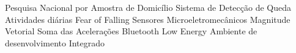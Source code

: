 \begin{acronym}[ACRONYM] 

 { Pesquisa Nacional por Amostra de Domicílio }
 {Sistema de Detecção de Queda}
 {Atividades diárias}
 {Fear of Falling}
 { Sensores Microeletromecânicos }
 { Magnitude Vetorial }
 {Soma das Acelerações}
 {Bluetooth Low Energy}
 {Ambiente de desenvolvimento Integrado}

    
\end{acronym}